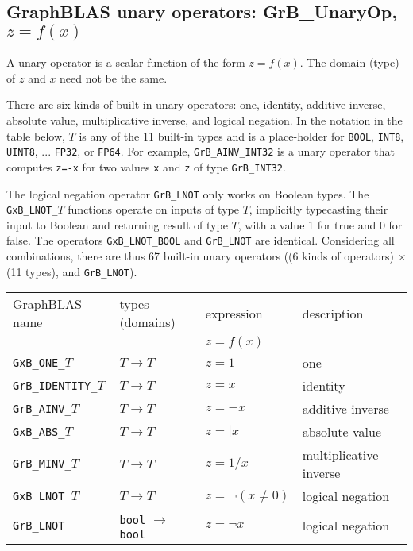 \documentclass[12pt]{article}
\begin{document}
\newpage
\subsection{GraphBLAS unary operators: {\sf GrB\_UnaryOp}, $z=f(x)$} %
\label{unaryop}

A unary operator is a scalar function of the form $z=f(x)$.  The domain (type)
of $z$ and $x$ need not be the same.

There are six kinds of built-in unary operators: one, identity,
additive inverse, absolute value,
multiplicative inverse, and logical negation.  In the notation in the table
below, $T$ is any of the 11 built-in types and is a place-holder for
\verb'BOOL', \verb'INT8', \verb'UINT8', ...  \verb'FP32', or \verb'FP64'.   For
example, \verb'GrB_AINV_INT32' is a unary operator that computes \verb'z=-x'
for two values \verb'x' and \verb'z' of type \verb'GrB_INT32'.

The logical negation operator \verb'GrB_LNOT' only works on Boolean types.  The
\verb'GxB_LNOT_'$T$ functions operate on inputs of type $T$, implicitly
typecasting their input to Boolean and returning result of type $T$, with a
value 1 for true and 0 for false.  The operators \verb'GxB_LNOT_BOOL' and
\verb'GrB_LNOT' are identical.
Considering all combinations, there are thus 67 built-in unary operators
((6 kinds of operators) $\times$ (11 types), and \verb'GrB_LNOT').

\vspace{0.2in}
{\footnotesize
\begin{tabular}{llll}
\hline
GraphBLAS name          & types (domains)   & expression    & description \\
                        &                   & $z=f(x)$      & \\
\hline
\verb'GxB_ONE_'$T$      & $T \rightarrow T$ & $z = 1$       & one \\
\verb'GrB_IDENTITY_'$T$ & $T \rightarrow T$ & $z = x$       & identity \\
\verb'GrB_AINV_'$T$     & $T \rightarrow T$ & $z = -x$      & additive inverse \\
\verb'GxB_ABS_'$T$      & $T \rightarrow T$ & $z = |x|$     & absolute value \\
\verb'GrB_MINV_'$T$     & $T \rightarrow T$ & $z = 1/x$     & multiplicative inverse \\
\verb'GxB_LNOT_'$T$     & $T \rightarrow T$ & $z = \lnot (x \ne 0)$ & logical negation \\
\hline
\verb'GrB_LNOT'         & \verb'bool'
                          $\rightarrow$
                          \verb'bool'       & $z = \lnot x$ & logical negation \\
\hline
\end{tabular}
}
\vspace{0.2in}
\end{document}
